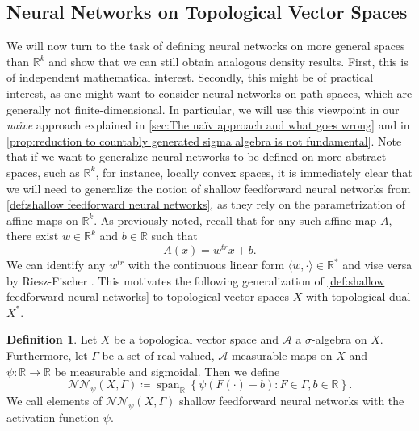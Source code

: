 \documentclass[11pt,a4paper,twoside,openany]{report}
\theoremstyle{plain} %
\theoremstyle{definition} %
\newtheorem{definition}[definition]{Definition}
\theoremstyle{remark} %
\let\parencite\authnumparencite
\begin{document}
\subsection{Neural Networks on Topological Vector Spaces}
We will now turn to the task of defining neural networks on more general spaces than \(\mathbb{R}^k\) and show that we can still obtain analogous density results. First, this is of independent mathematical interest. Secondly, this might be of practical interest, as one might want to consider neural networks on path-spaces, which are generally not finite-dimensional. In particular, we will use this viewpoint in our \textit{naïve} approach explained in \cref{sec:The naïv approach and what goes wrong} and in \cref{prop:reduction to countably generated sigma algebra is not fundamental}. 
\bigbreak
Note that if we want to generalize neural networks to be defined on more abstract spaces, such as \(\mathbb{R}^k\), for instance, locally convex spaces, it is immediately clear that we will need to generalize the notion of shallow feedforward neural networks from \cref{def:shallow feedforward neural networks}, as they rely on the parametrization of affine maps on \(\mathbb{R}^k\). As previously noted, recall that for any such affine map \(A\), there exist \(w\in\mathbb{R}^k\) and \(b \in \mathbb{R}\) such that 
\begin{equation}
    A(x)=w^{tr}x+b.
\end{equation}
We can identify any \(w^{tr}\) with the continuous linear form \(\langle w,\cdot\rangle\in\mathbb{R}^*\) and vise versa by Riesz-Fischer \parencite[Cor.~4.3.2.]{Bogachev2007MeasureTheory}. This motivates the following generalization of \cref{def:shallow feedforward neural networks} to topological vector spaces \(X\) with topological dual \(X^*\).
\begin{definition}\label{def:NN on locally convex X}
    Let \(X\) be a topological vector space and \(\mathcal{A}\) a \(\sigma\)-algebra on \(X\). Furthermore, let \(\Gamma\) be a set of real-valued, \(\mathcal{A}\)-measurable maps on \(X\) and \(\psi:\mathbb{R}\to\mathbb{R}\) be measurable and sigmoidal. Then we define 
    \begin{equation}
        \mathcal{NN}_{\psi}(X,\Gamma)\coloneqq\operatorname{span}_{\mathbb{R}}\left\{\psi(F(\cdot)+b):F\in \Gamma,b\in\mathbb{R}\right\}.
    \end{equation}
    We call elements of \(\mathcal{NN}_{\psi}(X,\Gamma)\) shallow feedforward neural networks with the activation function \(\psi\).
\end{definition}
\end{document}
